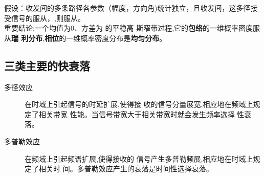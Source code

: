 假设：收发间的多条路径各参数（幅度，方向角)统计独立，且收发间{}，这多径接受信号的{}服从{}，{},则服从{}。\\
重要结论:一个均值为0、方差为 的平稳高
斯窄带过程,它的\textbf{包络}的一维概率密度服从\textbf{瑞
利分布},\textbf{相位}的一维概率密度分布是\textbf{均匀分布}。
\subsection{三类主要的快衰落
}
\begin{description}
	\item[多径效应] 在时域上引起信号的时延扩展,使得接
	收的信号分量展宽,相应地在频域上规定了相关带宽
	性能。当信号带宽大于相关带宽时就会发生频率选择
	性衰落。
	\item[多普勒效应] 在频域上引起频谱扩展,使得接收的
	信号产生多普勒频展,相应地在时域上规定了相关时
	间。多普勒效应产生的衰落是时间性选择衰落。
\end{description}
